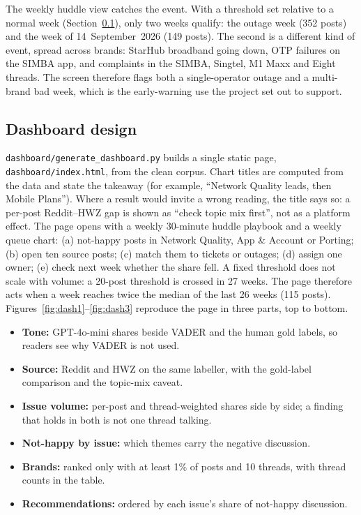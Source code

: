 \documentclass[11pt,a4paper]{article}
\begin{document}
The weekly huddle view catches the event. With a threshold set relative to a normal week (Section~\ref{sec:dashboard}), only two weeks qualify: the outage week (352 posts) and the week of 14~September~2026 (149 posts). The second is a different kind of event, spread across brands: StarHub broadband going down, OTP failures on the SIMBA app, and complaints in the SIMBA, Singtel, M1 Maxx and Eight threads. The screen therefore flags both a single-operator outage and a multi-brand bad week, which is the early-warning use the project set out to support.

\subsection{Dashboard design}
\label{sec:dashboard}

\texttt{dashboard/generate\_dashboard.py} builds a single static page, \texttt{dashboard/index.html}, from the clean corpus. Chart titles are computed from the data and state the takeaway (for example, ``Network Quality leads, then Mobile Plans''). Where a result would invite a wrong reading, the title says so: a per-post Reddit--HWZ gap is shown as ``check topic mix first'', not as a platform effect. The page opens with a weekly 30-minute huddle playbook and a weekly queue chart: (a) not-happy posts in Network Quality, App \& Account or Porting; (b) open ten source posts; (c) match them to tickets or outages; (d) assign one owner; (e) check next week whether the share fell. A fixed threshold does not scale with volume: a 20-post threshold is crossed in 27 weeks. The page therefore acts when a week reaches twice the median of the last 26 weeks (115 posts). Figures~\ref{fig:dash1}--\ref{fig:dash3} reproduce the page in three parts, top to bottom.

\begin{itemize}
  \item \textbf{Tone:} GPT-4o-mini shares beside VADER and the human gold labels, so readers see why VADER is not used.
  \item \textbf{Source:} Reddit and HWZ on the same labeller, with the gold-label comparison and the topic-mix caveat.
  \item \textbf{Issue volume:} per-post and thread-weighted shares side by side; a finding that holds in both is not one thread talking.
  \item \textbf{Not-happy by issue:} which themes carry the negative discussion.
  \item \textbf{Brands:} ranked only with at least 1\% of posts and 10 threads, with thread counts in the table.
  \item \textbf{Recommendations:} ordered by each issue's share of not-happy discussion.
\end{itemize}
\end{document}
